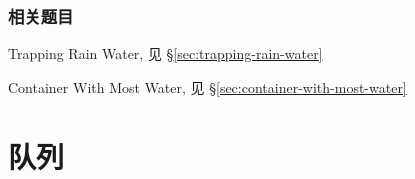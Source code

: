 \subsubsection{相关题目}
\begindot
\item Trapping Rain Water, 见 \S \ref{sec:trapping-rain-water}
\item Container With Most Water, 见 \S \ref{sec:container-with-most-water}
\myenddot


\section{队列} %

